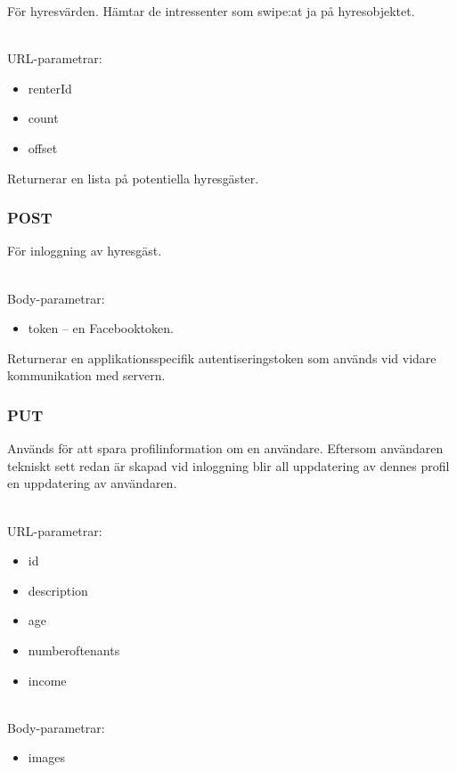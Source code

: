 \documentclass{article}
\begin{document}
För hyresvärden. Hämtar de intressenter som swipe:at ja på hyresobjektet.

\\URL-parametrar:

\begin{itemize}
    \item renterId
    \item count
    \item offset
\end{itemize}

Returnerar en lista på potentiella hyresgäster.

\subsubsection {POST}
\label{ssub:POST}

För inloggning av hyresgäst.

\\Body-parametrar:

\begin{itemize}
    \item token -- en Facebooktoken.
\end{itemize}

Returnerar en applikationsspecifik autentiseringstoken som används vid vidare kommunikation med servern.

\subsubsection {PUT}
\label{ssub:PUT}

Används för att spara profilinformation om en användare. Eftersom användaren tekniskt sett redan är skapad vid inloggning blir all uppdatering av
dennes profil en uppdatering av användaren.

\\URL-parametrar:

\begin{itemize}
    \item id
    \item description
    \item age
    \item numberoftenants
    \item income
\end{itemize}

\\Body-parametrar:

\begin{itemize}
    \item images
\end{itemize}
\end{document}
